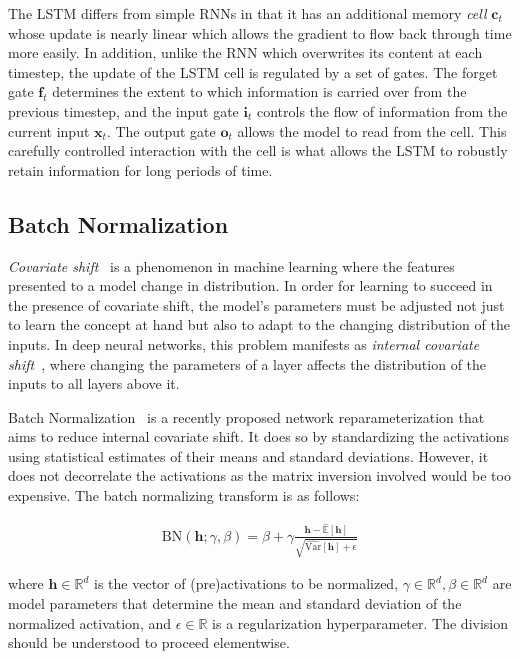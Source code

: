 \documentclass{article} %
\newcommand{\vect}[1]{\mathbf{#1}}
\newcommand{\reals}{\mathbb{R}}
\begin{document}
The LSTM differs from simple RNNs in that it has an additional memory \emph{cell} 
$\vect{c}_t$ whose update is nearly linear which allows the gradient to flow back 
through time more easily. In addition, unlike the RNN which overwrites its content 
at each timestep, the update of the LSTM cell is regulated by a set of gates.
The forget gate $\vect{f}_t$ determines the extent to which information is carried over from the previous timestep,
and the input gate $\vect{i}_t$ controls the flow of information from the current input $\vect{x}_t$.
The output gate $\vect{o}_t$ allows the model to read from the cell. This carefully 
controlled interaction with the cell is what allows the LSTM to robustly retain 
information for long periods of time.

\subsection{Batch Normalization}

\emph{Covariate shift}~\cite{shimodaira2000improving} is a phenomenon in machine learning where
the features presented to a model change in distribution.
In order for learning to succeed in the presence of covariate shift,
the model's parameters must be adjusted not just to learn the concept at hand
but also to adapt to the changing distribution of the inputs.
In deep neural networks, this problem manifests as \emph{internal covariate shift}~\cite{batchnorm},
where changing the parameters of a layer affects the distribution of the inputs to all layers above it.

Batch Normalization~\cite{batchnorm} is a recently proposed network reparameterization that aims to reduce internal covariate shift.
It does so by standardizing the activations using statistical estimates of their means and standard deviations.
However, it does not decorrelate the activations as the matrix inversion involved would be too expensive.
The batch normalizing transform is as follows:

\begin{align}
\mathrm{BN}(\vect{h}; \gamma, \beta) =
  \beta + \gamma
  \frac{\vect{h} -   \widehat{\mathbb{E  }}[\vect{h}]}
       {       \sqrt{\widehat{\mathrm{Var}}[\vect{h}] + \epsilon}}
\end{align}

where $\vect{h} \in \reals^d$ is the vector of (pre)activations to be normalized, 
$\gamma \in \reals^d, \beta \in \reals^d$ are model parameters that determine the 
mean and standard deviation of the normalized activation, and $\epsilon \in \reals$ 
is a regularization hyperparameter. The division should be understood to proceed elementwise.
\end{document}

